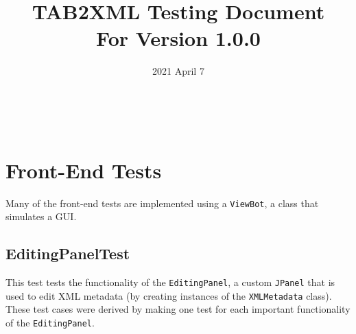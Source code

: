 \documentclass[11pt]{article}
\date{2021 April 7}
\title{TAB2XML Testing Document\\\medskip
\large For Version 1.0.0}
\begin{document}
\maketitle
\tableofcontents

\newpage\\
\section{Front-End Tests}
\label{sec:org4e4d6f6}
Many of the front-end tests are implemented using a \texttt{ViewBot}, a class that simulates a GUI.\\
\subsection{EditingPanelTest}
\label{sec:orgcdad324}
This test tests the functionality of the \texttt{EditingPanel}, a custom \texttt{JPanel} that is used to edit XML metadata (by creating instances of the \texttt{XMLMetadata} class).  These test cases were derived by making one test for each important functionality of the \texttt{EditingPanel}.\\
\end{document}
